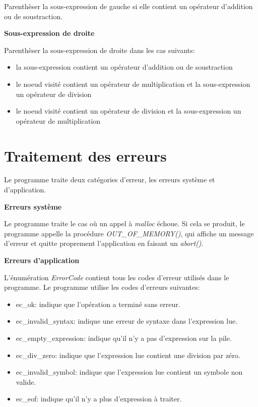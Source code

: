 \documentclass[10pt]{report}
\begin{document}
Parenthèser la sous-expression de gauche si elle contient un opérateur d'addition ou de soustraction.

\textbf{Sous-expression de droite}

Parenthèser la sous-expression de droite dans les cas suivants:

\begin{itemize}
\item la sous-expression contient un opérateur d'addition ou de soustraction
\item le noeud visité contient un opérateur de multiplication et la sous-expression un opérateur de division
\item le noeud visité contient un opérateur de division et la sous-expression un opérateur de multiplication
\end{itemize}

\section{Traitement des erreurs}
Le programme traite deux catégories d'erreur, les erreurs système et
d'application.

\textbf{Erreurs système}

Le programme traite le cas où un appel à \emph{malloc} échoue. Si cela se
produit, le programme appelle la procédure \emph{OUT\_OF\_MEMORY()}, qui affiche un message
d'erreur et quitte proprement l'application en faisant un \emph{abort()}.

\textbf{Erreurs d'application}

L'énumération \emph{ErrorCode} contient tous les codes d'erreur utilisés dans
le programme. Le programme utilise les codes d'erreurs suivantes:

\begin{itemize}
\item ec\_ok: indique que l'opération a terminé sans erreur.
\item ec\_invalid\_syntax: indique une erreur de syntaxe dans l'expression
lue.
\item ec\_empty\_expression: indique qu'il n'y a pas d'expression sur la pile. 
\item ec\_div\_zero: indique que l'expression lue contient une division par
zéro.
\item ec\_invalid\_symbol: indique que l'expression lue contient un symbole
non valide.
\item ec\_eof: indique qu'il n'y a plus d'expression à traiter.
\end{itemize}
\end{document}
